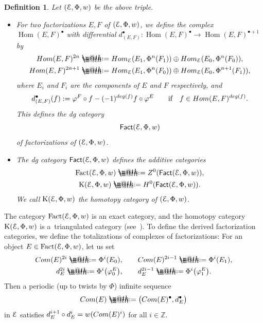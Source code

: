 \documentclass[11pt]{article}
\makeatletter
\numberwithin{equation}{section}
\newtheorem{dfn}{Definition}[section]
\newcommand*{\defeq}{\mathrel{\rlap{%
 \raisebox{0.3ex}{$\m@th\cdot$}}%
 \raisebox{-0.3ex}{$\m@th\cdot$}}%
 =}
\numberwithin{equation}{section}
\newcommand{\Fact}{\operatorname{Fact}}
\newcommand{\dgFact}{\operatorname{\sf{Fact}}}
\newcommand{\Hom}{\operatorname{Hom}}
\newcommand{\K}{\operatorname{K}}
\newcommand{\bZ}{\mathbb{Z}}
\newcommand{\scrE}{\EuScript{E}}
\makeatother
\begin{document}
\begin{dfn}
Let $(\scrE,\Phi,w)$ be the above triple.
\begin{itemize}\itemsep=0pt
\item[$1.$] For two factorizations $E,F$ of $(\scrE,\Phi,w)$, we define the complex $\Hom(E,F)^{\bullet}$ with differential $d^{\bullet}_{(E,F)}\colon\Hom(E,F)^{\bullet}\to\Hom(E,F)^{\bullet+1}$ by
\begin{gather*}
{\rm Hom}(E,F)^{2n}\defeq{\rm Hom}_{\scrE}(E_1,\Phi^n(F_1))\oplus{\rm Hom}_{\scrE}(E_0,\Phi^n(F_0)),
\\
{\rm Hom}(E,F)^{2n+1}\defeq{\rm Hom}_{\scrE}(E_1,\Phi^{n}(F_0))\oplus{\rm Hom}_{\scrE}(E_0,\Phi^{n+1}(F_1)),
\end{gather*}
where $E_i$ and $F_i$ are the components of $E$ and $F$ respectively, and
\begin{gather*}
d^{\bullet}_{(E,F)}(f):=\varphi^F\circ f-(-1)^{{\rm deg}(f)}f\circ \varphi^E
\qquad\text{if}\quad f\in{\rm Hom}(E,F)^{{\rm deg}(f)}.
\end{gather*}
This defines the dg category
\begin{gather*}
\dgFact(\scrE,\Phi,w)
\end{gather*}
of factorizations of $(\scrE,\Phi,w)$.

\item[$2.$] The dg category $\dgFact(\scrE,\Phi,w)$ defines the additive categories
\begin{gather*}
\Fact(\scrE,\Phi,w)\defeq Z^0(\dgFact(\scrE,\Phi,w)),
\\
\K(\scrE,\Phi,w)\defeq H^0(\dgFact(\scrE,\Phi,w)).
\end{gather*}
We call $\K(\scrE,\Phi,w)$ the {\it homotopy category} of $(\scrE,\Phi,w)$.
\end{itemize}
\end{dfn}

The category $\Fact(\scrE,\Phi,w)$ is an exact category, and the homotopy category $\K(\scrE,\Phi,w)$ is a~triangulated category (see~\cite[Propositions~3.5 and~3.9]{H1}). To define the derived factorization categories, we define the totalizations of complexes of factorizations: For an object $E\in \Fact(\scrE,\Phi,w)$, let us set
\begin{gather*}
{\rm Com}(E)^{2i}\defeq\Phi^i(E_0), \qquad {\rm Com}(E)^{2i-1}\defeq\Phi^i(E_1),
\\
d_E^{2i}\defeq\Phi^i\big(\varphi_0^E\big),\qquad d_E^{2i-1}\defeq\Phi^i\big(\varphi_1^E\big).
\end{gather*}
Then a periodic (up to twists by $\Phi$) infinite sequence
\begin{gather*}
{\rm Com}(E)\defeq\big({\rm Com}(E)^{\bullet}, d_E^{\bullet}\big)
\end{gather*}
 in $\scrE$ satisfies $d_E^{i+1}\circ d_E^i=w({\rm Com}(E)^i)$ for all $i\in\bZ$.
\end{document}
